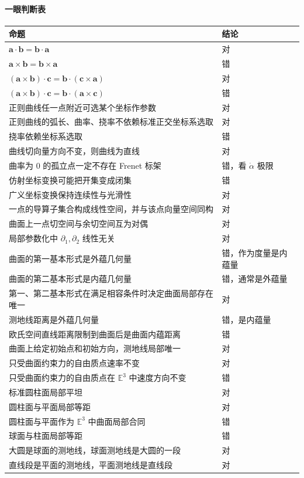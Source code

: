\documentclass[UTF8,12pt,a4paper]{ctexart}
\newcommand{\E}{\mathbb E}
\newcommand{\vct}[1]{\boldsymbol{#1}}
\begin{document}
\paragraph{一眼判断表}
\begin{longtable}{@{}>{\raggedright\arraybackslash}p{}>{\centering\arraybackslash}p{}@{}}
\toprule
命题 & 结论\\
\midrule
$\vct a\cdot\vct b=\vct b\cdot\vct a$ & 对\\
$\vct a\times\vct b=\vct b\times\vct a$ & 错\\
$(\vct a\times\vct b)\cdot\vct c=\vct b\cdot(\vct c\times\vct a)$ & 对\\
$(\vct a\times\vct b)\cdot\vct c=\vct b\cdot(\vct a\times\vct c)$ & 错\\
正则曲线任一点附近可选某个坐标作参数 & 对\\
正则曲线的弧长、曲率、挠率不依赖标准正交坐标系选取 & 对\\
挠率依赖坐标系选取 & 错\\
曲线切向量方向不变，则曲线为直线 & 对\\
曲率为 $0$ 的孤立点一定不存在 Frenet 标架 & 错，看 $\dot\alpha$ 极限\\
仿射坐标变换可能把开集变成闭集 & 错\\
广义坐标变换保持连续性与光滑性 & 对\\
一点的导算子集合构成线性空间，并与该点向量空间同构 & 对\\
曲面上一点切空间与余切空间互为对偶 & 对\\
局部参数化中 $\partial_1,\partial_2$ 线性无关 & 对\\
曲面的第一基本形式是外蕴几何量 & 错，作为度量是内蕴量\\
曲面的第二基本形式是内蕴几何量 & 错，通常是外蕴量\\
第一、第二基本形式在满足相容条件时决定曲面局部存在唯一 & 对\\
测地线距离是外蕴几何量 & 错，是内蕴量\\
欧氏空间直线距离限制到曲面后是曲面内蕴距离 & 错\\
曲面上给定初始点和初始方向，测地线局部唯一 & 对\\
只受曲面约束力的自由质点速率不变 & 对\\
只受曲面约束力的自由质点在 $\E^3$ 中速度方向不变 & 错\\
标准圆柱面局部平坦 & 对\\
圆柱面与平面局部等距 & 对\\
圆柱面与平面作为 $\E^3$ 中曲面局部合同 & 错\\
球面与柱面局部等距 & 错\\
大圆是球面的测地线，球面测地线是大圆的一段 & 对\\
直线段是平面的测地线，平面测地线是直线段 & 对\\
\bottomrule
\end{longtable}
\end{document}
